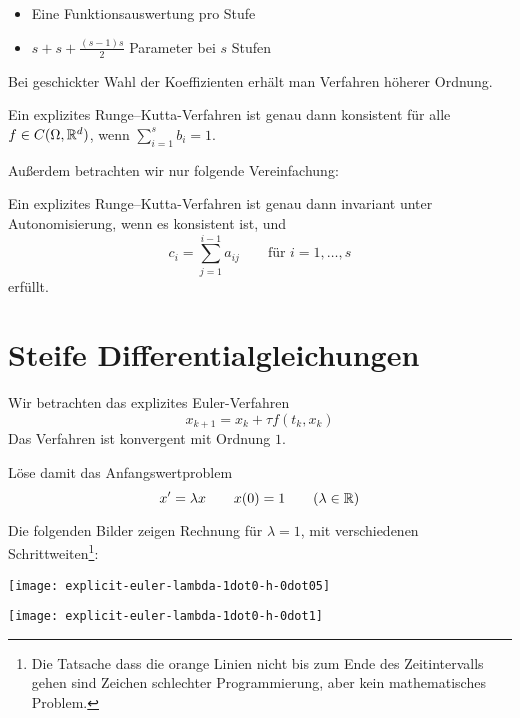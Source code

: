 \begin{itemize}
	\item Eine Funktionsauswertung pro Stufe
	\item $s + s + \frac{(s-1)s}{2}$ Parameter bei $s$ Stufen
\end{itemize}

Bei geschickter Wahl der Koeffizienten erhält man Verfahren höherer Ordnung.

\begin{lemma}
	Ein explizites Runge--Kutta-Verfahren ist genau dann konsistent für alle $f \in C(\Omega,\mathbb R^d)$, wenn $\sum_{i=1}^s b_i = 1$.
\end{lemma}

Außerdem betrachten wir nur folgende Vereinfachung:

\begin{lemma}
	Ein explizites Runge--Kutta-Verfahren ist genau dann invariant unter Autonomisierung, wenn es konsistent ist, und
	\begin{equation*}
		c_i=\sum_{j=1}^{i-1} a_{ij}
		\qquad
		\text{für $i=1,\dots,s$}
	\end{equation*}
	erfüllt.
\end{lemma}

\section{Steife Differentialgleichungen}

Wir betrachten das explizites Euler-Verfahren
\begin{equation*}
	x_{k+1}=x_k+\tau f \left(t_k,x_k \right)
\end{equation*}
Das Verfahren ist konvergent mit Ordnung $1$.

Löse damit das Anfangswertproblem
\begin{equation*}
	x' =\lambda x \qquad x(0)=1 \qquad (\lambda \in \mathbb R)
\end{equation*}

Die folgenden Bilder zeigen Rechnung für $\lambda = 1$, mit verschiedenen Schrittweiten\footnote{Die Tatsache dass die orange Linien nicht bis zum Ende des Zeitintervalls gehen sind Zeichen schlechter Programmierung, aber kein mathematisches Problem.}:

\begin{center}
	\begin{minipage}{0.49\textwidth}
		\centering
		\texttt{[image: explicit-euler-lambda-1dot0-h-0dot05]}
	\end{minipage}
	\begin{minipage}{0.49\textwidth}
		\centering
		\texttt{[image: explicit-euler-lambda-1dot0-h-0dot1]}
	\end{minipage}
\end{center}

